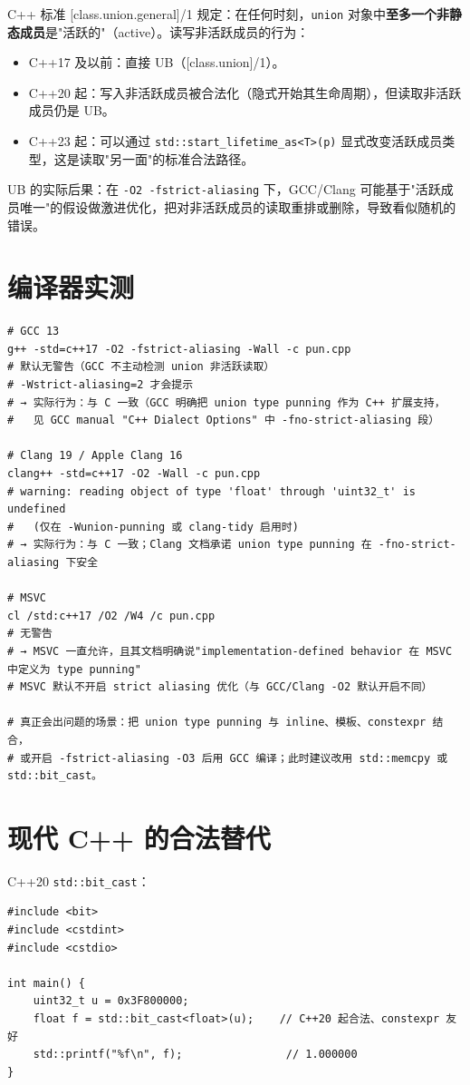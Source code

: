 \documentclass[12pt,a4paper,fontset=fandol]{ctexbook}
\newcommand{\cpplabel}{%
  \tcbox[on line,colback=cppheadbg,colframe=cppheadbg,
    boxrule=0pt,arc=1pt,left=2pt,right=2pt,top=1pt,bottom=1pt,
    colupper=white,fontupper=\scriptsize\bfseries]{C++}}
\newcommand{\shelllabel}{%
  \tcbox[on line,colback=bashheadbg,colframe=bashheadbg,
    boxrule=0pt,arc=1pt,left=2pt,right=2pt,top=1pt,bottom=1pt,
    colupper=white,fontupper=\scriptsize\bfseries]{Shell}}
\newcommand{\cpp}[1]{C++#1}
\newcommand{\kw}[1]{\texttt{#1}}
\begin{document}
\cpp{} 标准 [class.union.general]/1 规定：在任何时刻，\kw{union} 对象中\textbf{至多一个非静态成员}是"活跃的"（active）。读写非活跃成员的行为：
\begin{itemize}
  \item C++17 及以前：直接 UB（[class.union]/1）。
  \item C++20 起：写入非活跃成员被合法化（隐式开始其生命周期），但读取非活跃成员仍是 UB。
  \item C++23 起：可以通过 \kw{std::start\_lifetime\_as<T>(p)} 显式改变活跃成员类型，这是读取"另一面"的标准合法路径。
\end{itemize}

UB 的实际后果：在 \kw{-O2 -fstrict-aliasing} 下，GCC/Clang 可能基于"活跃成员唯一"的假设做激进优化，把对非活跃成员的读取重排或删除，导致看似随机的错误。

\section{编译器实测}

\shelllabel{}
\begin{lstlisting}[style=bashstyle]
# GCC 13
g++ -std=c++17 -O2 -fstrict-aliasing -Wall -c pun.cpp
# 默认无警告（GCC 不主动检测 union 非活跃读取）
# -Wstrict-aliasing=2 才会提示
# → 实际行为：与 C 一致（GCC 明确把 union type punning 作为 C++ 扩展支持，
#   见 GCC manual "C++ Dialect Options" 中 -fno-strict-aliasing 段）

# Clang 19 / Apple Clang 16
clang++ -std=c++17 -O2 -Wall -c pun.cpp
# warning: reading object of type 'float' through 'uint32_t' is undefined
#   (仅在 -Wunion-punning 或 clang-tidy 启用时)
# → 实际行为：与 C 一致；Clang 文档承诺 union type punning 在 -fno-strict-aliasing 下安全

# MSVC
cl /std:c++17 /O2 /W4 /c pun.cpp
# 无警告
# → MSVC 一直允许，且其文档明确说"implementation-defined behavior 在 MSVC 中定义为 type punning"
# MSVC 默认不开启 strict aliasing 优化（与 GCC/Clang -O2 默认开启不同）

# 真正会出问题的场景：把 union type punning 与 inline、模板、constexpr 结合，
# 或开启 -fstrict-aliasing -O3 后用 GCC 编译；此时建议改用 std::memcpy 或 std::bit_cast。
\end{lstlisting}

\section{现代 C++ 的合法替代}

\cpplabel{} C++20 \kw{std::bit\_cast}：
\begin{lstlisting}
#include <bit>
#include <cstdint>
#include <cstdio>

int main() {
    uint32_t u = 0x3F800000;
    float f = std::bit_cast<float>(u);    // C++20 起合法、constexpr 友好
    std::printf("%f\n", f);                // 1.000000
}
\end{lstlisting}
\end{document}

